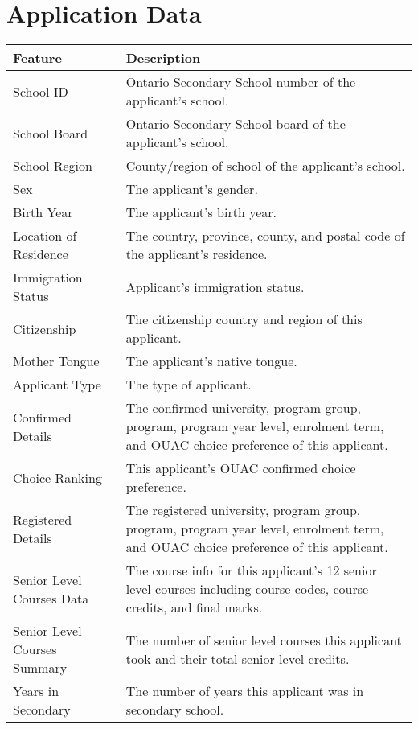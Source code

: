 \documentclass[titlepage]{article}
\begin{document}
\section{Application Data}
\label{app:applicationData}
\vspace*{\fill}
\begin{table}[!hb]
\begin{center}
\begin{tabular}{| C{4cm} | C{10cm} |}\hline
	\textbf{Feature}				&\textbf{Description}\\\hline
	School ID						&Ontario Secondary School number of the applicant's school.\\\hline
	School Board					&Ontario Secondary School board of the applicant's school.\\\hline
	School Region					&County/region of school of the applicant's school.\\\hline
	Sex								&The applicant's gender.\\\hline
	Birth Year						&The applicant's birth year.\\\hline
	Location of Residence			&The country, province, county, and postal code of the applicant's residence.\\\hline
	Immigration Status				&Applicant's immigration status.\\\hline
	Citizenship						&The citizenship country and region of this applicant.\\\hline
	Mother Tongue					&The applicant's native tongue.\\\hline
	Applicant Type					&The type of applicant.\\\hline
	Confirmed Details				&The confirmed university, program group, program, program year level, enrolment term, and OUAC choice preference of this applicant.\\\hline
	Choice Ranking					&This applicant's OUAC confirmed choice preference.\\\hline
	Registered Details				&The registered university, program group, program, program year level, enrolment term, and OUAC choice preference of this applicant.\\\hline
	Senior Level Courses Data		&The course info for this applicant's 12 senior level courses including course codes, course credits, and final marks.\\\hline
	Senior Level Courses Summary	&The number of senior level courses this applicant took and their total senior level credits.\\\hline
	Years in Secondary				&The number of years this applicant was in secondary school.\\\hline

\end{tabular}
\end{center}
\end{table}
\end{document}
